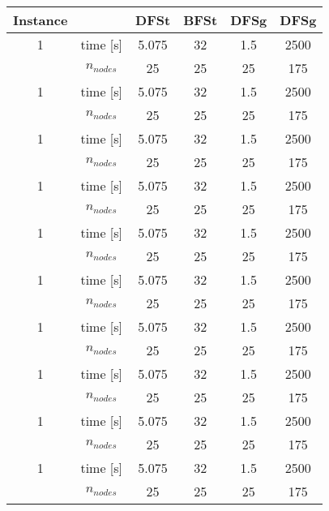 \documentclass[a4paper,10pt]{article}
\begin{document}
\begin{enumerate}
\begin{center}
\begin{tabular}{cccccc} 
 \toprule
  Instance & & DFSt & BFSt & DFSg & DFSg\\
  \midrule
 1 & time [s] & 5.075 & 32 & 1.5 & 2500 \\ 
   & $n_{nodes}$ & 25    & 25 & 25  & 175 \\ 
 1 & time [s] & 5.075 & 32 & 1.5 & 2500 \\ 
   & $n_{nodes}$ & 25    & 25 & 25  & 175 \\ 
 1 & time [s] & 5.075 & 32 & 1.5 & 2500 \\ 
   & $n_{nodes}$ & 25    & 25 & 25  & 175 \\ 
 1 & time [s] & 5.075 & 32 & 1.5 & 2500 \\ 
   & $n_{nodes}$ & 25    & 25 & 25  & 175 \\ 
 1 & time [s] & 5.075 & 32 & 1.5 & 2500 \\ 
   & $n_{nodes}$ & 25    & 25 & 25  & 175 \\ 
 1 & time [s] & 5.075 & 32 & 1.5 & 2500 \\ 
   & $n_{nodes}$ & 25    & 25 & 25  & 175 \\ 
 1 & time [s] & 5.075 & 32 & 1.5 & 2500 \\ 
   & $n_{nodes}$ & 25    & 25 & 25  & 175 \\ 
 1 & time [s] & 5.075 & 32 & 1.5 & 2500 \\ 
   & $n_{nodes}$ & 25    & 25 & 25  & 175 \\ 
 1 & time [s] & 5.075 & 32 & 1.5 & 2500 \\ 
   & $n_{nodes}$ & 25    & 25 & 25  & 175 \\ 
 1 & time [s] & 5.075 & 32 & 1.5 & 2500 \\ 
   & $n_{nodes}$ & 25    & 25 & 25  & 175 \\ 
 \bottomrule
\end{tabular}
\end{center}


\end{enumerate}
\end{document}
